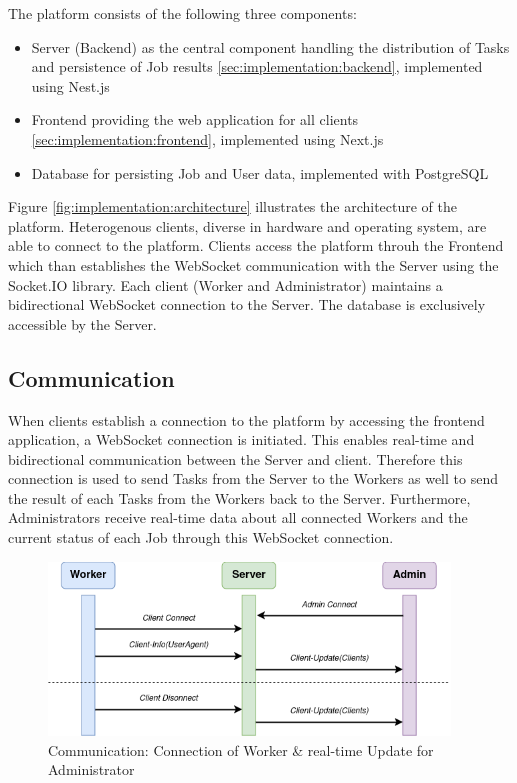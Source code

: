 The platform consists of the following three components:
\begin{itemize}
    \item Server (Backend) as the central component handling the distribution of Tasks and persistence of Job results \ref{sec:implementation:backend}, implemented using Nest.js \cite{methodology:nestjs}
    \item Frontend providing the web application for all clients \ref{sec:implementation:frontend}, implemented using Next.js \cite{methodology:nextjs}
    \item Database for persisting Job and User data, implemented with PostgreSQL \cite{methodology:db}
\end{itemize}

Figure \ref{fig:implementation:architecture} illustrates the architecture of the platform. Heterogenous clients, diverse in hardware and operating system, are able to connect to the platform. Clients access the platform throuh the Frontend which than establishes the WebSocket communication with the Server using the Socket.IO \cite{methodology:websockets2} library. Each client (Worker and Administrator) maintains a bidirectional WebSocket connection to the Server. The database is exclusively accessible by the Server.

\subsection{Communication}
\label{subsec:implementation:architecture:communication}
When clients establish a connection to the platform by accessing the frontend application, a WebSocket connection is initiated. This enables real-time and bidirectional communication between the Server and client. Therefore this connection is used to send Tasks from the Server to the Workers as well to send the result of each Tasks from the Workers back to the Server. Furthermore, Administrators receive real-time data about all connected Workers and the current status of each Job through this WebSocket connection.

\begin{figure}[htbp]
    \centering
    \includegraphics[width=0.95\textwidth]{gfx/figures/communication-connection.png}
    \caption{Communication: Connection of Worker \& real-time Update for Administrator}
    \label{fig:implementation:communication1}
\end{figure}

